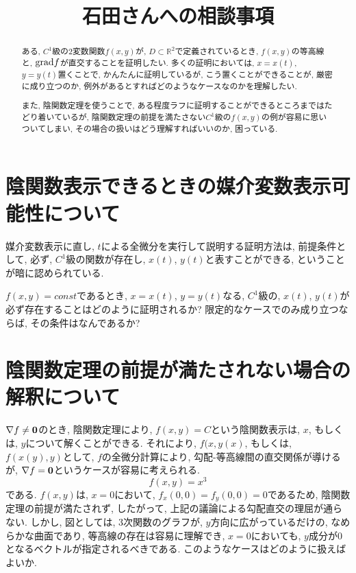\documentclass{jsarticle}
\title{石田さんへの相談事項}
\newcommand*{\mbold}[1]{\mbox{\boldmath $#1$}}
\newcommand*{\grad}{{\rm grad}}
\begin{document}
\maketitle
\begin{abstract}
  ある, $C^1$級の$2$変数関数$f(x, y)$が, $D \subset \mathbb{R}^2$で定義されているとき, 
  $f(x, y)$の等高線と, $\grad{f}$が直交することを証明したい. 
  多くの証明においては, $x = x(t)$, $y = y(t)$置くことで, かんたんに証明しているが, 
  こう置くことができることが, 厳密に成り立つのか, 例外があるとすればどのようなケースなのかを理解したい.

  また, 陰関数定理を使うことで, ある程度ラフに証明することができるところまではたどり着いているが, 陰関数定理の前提を満たさない$C^1$級の$f(x, y)$の例が容易に思いついてしまい, その場合の扱いはどう理解すればいいのか, 困っている. 
\end{abstract}
\section{陰関数表示できるときの媒介変数表示可能性について}
媒介変数表示に直し, $t$による全微分を実行して説明する証明方法は, 前提条件として, 
必ず, $C^1$級の関数が存在し, $x(t)$, $y(t)$と表すことができる, ということが暗に認められている. 

$f(x, y) = const$であるとき, $x = x(t)$, $y = y(t)$なる, $C^1$級の, $x(t)$, $y(t)$が必ず存在することはどのように証明されるか? 限定的なケースでのみ成り立つならば, その条件はなんであるか?

\section{陰関数定理の前提が満たされない場合の解釈について}
$\nabla f \neq \mbold{0}$のとき, 陰関数定理により, $f(x, y) = C$という陰関数表示は, $x$, もしくは, $y$について解くことができる. それにより, $f(x, y(x)$, もしくは, $f(x(y), y)$として, $f$の全微分計算により, 勾配-等高線間の直交関係が導けるが, $\nabla f = \mbold{0}$というケースが容易に考えられる. 
\begin{equation}
  f(x, y) = x^3
\end{equation}
である. $f(x, y)$は, $x = 0$において, $f_x(0, 0) = f_y(0, 0) = 0$であるため, 陰関数定理の前提が満たされず, したがって, 上記の議論による勾配直交の理屈が通らない. 
しかし, 図としては, 3次関数のグラフが, $y$方向に広がっているだけの, なめらかな曲面であり, 等高線の存在は容易に理解でき, $x = 0$においても, $y$成分が$0$となるベクトルが指定されるべきである. 
このようなケースはどのように扱えばよいか. 
\end{document}
